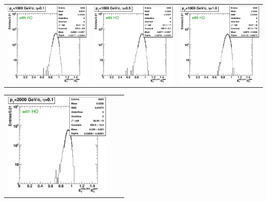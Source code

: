 \documentclass{cmspaper}
\begin{document}
\begin{appendices}
\begin{center}
\begin{tabular}{lll}
\end{tabular}
\end{center}
\begin{center}
\begin{tabular}{lll}
 \includegraphics[width=2in]{figs/h_ETRatioWithHO_ET_py_fit_corr_eta0.1_pT1000.eps} &
 \includegraphics[width=2in]{figs/h_ETRatioWithHO_ET_py_fit_corr_eta0.5_pT1000.eps} &
 \includegraphics[width=2in]{figs/h_ETRatioWithHO_ET_py_fit_corr_eta1.0_pT1000.eps} \\
\end{tabular}
\end{center}
\begin{center}
\begin{tabular}{lll}
 \includegraphics[width=2in]{figs/h_ETRatioWithHO_ET_py_fit_corr_eta0.1_pT2000.eps} &

\end{tabular}
\end{center}
\end{appendices}
\end{document}
